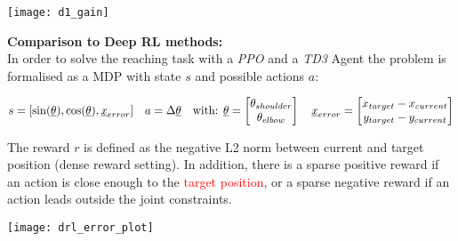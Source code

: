 \documentclass[portrait,final,a0paper,fontscale=0.39]{baposter}
\begin{document}
\begin{poster}
{\begin{adjustbox}{minipage=0.95\textwidth, margin=5pt, center}
\begin{minipage}[t]{0.25\textwidth}
\begin{center}
				\texttt{[image: d1\_gain]}
			\end{center}
		\end{minipage}
		\hfill
		\begin{minipage}[t]{0.725\textwidth}
			\vspace{8pt}
			\textbf{Comparison to Deep RL methods:}\\[2pt]
			In order to solve the reaching task with a \textit{PPO} \parencite{schulmanProximalPolicyOptimization2017} and a \textit{TD3} Agent \parencite{fujimoto2018addressing} the problem is formalised as a MDP with state $s$ and possible actions $a$:\\[-8pt]
			\begin{center}
				$s = [\sin(\underline{\theta}),  \cos(\underline{\theta}), \underline{x}_{error}] \hspace{10pt} a = \Delta\underline{\theta}\hspace{10pt} \text{with:  } \underline{\theta}=\begin{bmatrix}
					\theta_{shoulder} \\
					\theta_{elbow} \\ 
				\end{bmatrix} \hspace{10pt} 
				\underline{x}_{error}=\begin{bmatrix}
					x_{target} - x_{current} \\
					y_{target} - y_{current} \\ 
				\end{bmatrix}  \vspace{5pt}
				$
			\end{center}
			The reward $r$ is defined as the negative L2 norm between current and target position (dense reward setting). In addition, there is a sparse positive reward if an action is close enough to the \textcolor{red}{target position}, or a sparse negative reward if an action leads outside the joint constraints.\\[5pt]
			\begin{center}
				\texttt{[image: drl\_error\_plot]}
			\end{center}
		\end{minipage}
		\hfill
	\end{adjustbox}

}


\end{poster}
\end{document}

